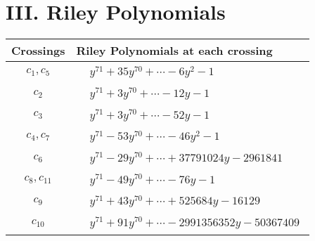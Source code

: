 \documentclass[1p]{elsarticle_modified}
\theoremstyle{definition}
\begin{document}
\centering \section*{ III. Riley Polynomials}
\begin{tabular}{m{50pt}|m{274pt}}
Crossings & \hspace{64pt}Riley Polynomials at each crossing \\
\hline $$\begin{aligned}c_{1},c_{5}\end{aligned}$$&$\begin{aligned}
&y^{71}+35 y^{70}+\cdots-6 y^2-1
\end{aligned}$\\
\hline $$\begin{aligned}c_{2}\end{aligned}$$&$\begin{aligned}
&y^{71}+3 y^{70}+\cdots-12 y-1
\end{aligned}$\\
\hline $$\begin{aligned}c_{3}\end{aligned}$$&$\begin{aligned}
&y^{71}+3 y^{70}+\cdots-52 y-1
\end{aligned}$\\
\hline $$\begin{aligned}c_{4},c_{7}\end{aligned}$$&$\begin{aligned}
&y^{71}-53 y^{70}+\cdots-46 y^2-1
\end{aligned}$\\
\hline $$\begin{aligned}c_{6}\end{aligned}$$&$\begin{aligned}
&y^{71}-29 y^{70}+\cdots+37791024 y-2961841
\end{aligned}$\\
\hline $$\begin{aligned}c_{8},c_{11}\end{aligned}$$&$\begin{aligned}
&y^{71}-49 y^{70}+\cdots-76 y-1
\end{aligned}$\\
\hline $$\begin{aligned}c_{9}\end{aligned}$$&$\begin{aligned}
&y^{71}+43 y^{70}+\cdots+525684 y-16129
\end{aligned}$\\
\hline $$\begin{aligned}c_{10}\end{aligned}$$&$\begin{aligned}
&y^{71}+91 y^{70}+\cdots-2991356352 y-50367409
\end{aligned}$\\
\hline
\end{tabular}
\vskip 2pc
\end{document}
